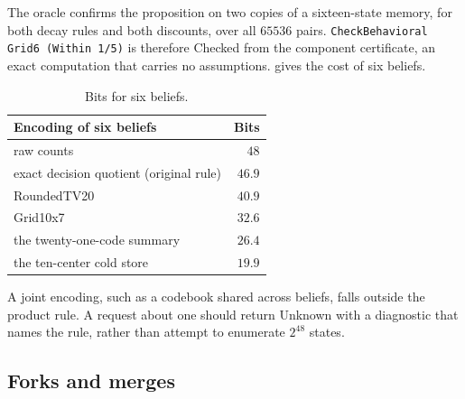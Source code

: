 \documentclass[11pt]{article}
\newcommand{\code}[1]{\texttt{#1}}
\theoremstyle{definition}
\theoremstyle{plain}
\begin{document}
The oracle confirms the proposition on two copies of a sixteen-state memory, for both decay rules
and both discounts, over all $65536$ pairs. \code{CheckBehavioral Grid6 (Within 1/5)} is therefore
Checked from the component certificate, an exact computation that carries no assumptions.  gives the cost of six beliefs.

\begin{table}[ht]
\centering\small
\begin{tabular}{lr}
\toprule
Encoding of six beliefs & Bits\\
\midrule
raw counts & $48$\\
exact decision quotient (original rule) & $46.9$\\
RoundedTV20 & $40.9$\\
Grid10x7 & $32.6$\\
the twenty-one-code summary & $26.4$\\
the ten-center cold store & $19.9$\\
\bottomrule
\end{tabular}
\caption{Bits for six beliefs.}\label{tab:ex1bits}
\end{table}

A joint encoding, such as a codebook shared across beliefs, falls outside the product rule. A
request about one should return Unknown with a diagnostic that names the rule, rather than
attempt to enumerate $2^{48}$ states.

\subsection{Forks and merges}
\end{document}

